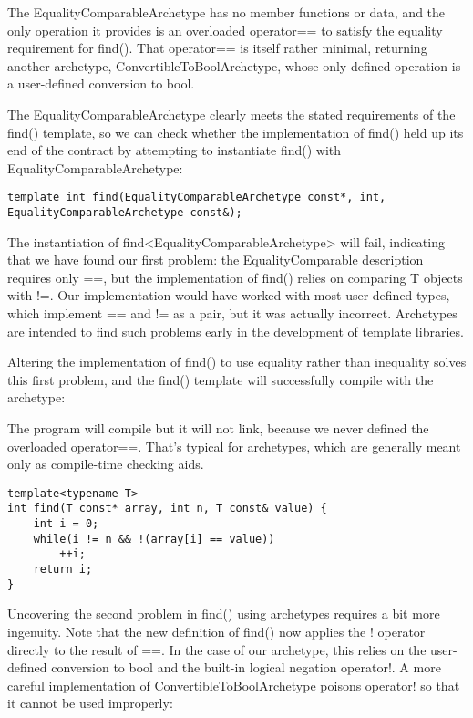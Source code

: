 The EqualityComparableArchetype has no member functions or data, and the only operation it provides is an overloaded operator== to satisfy the equality requirement for find(). That operator== is itself rather minimal, returning another archetype, ConvertibleToBoolArchetype, whose only defined operation is a user-defined conversion to bool.

The EqualityComparableArchetype clearly meets the stated requirements of the find() template, so we can check whether the implementation of find() held up its end of the contract by attempting to instantiate find() with EqualityComparableArchetype:

\begin{lstlisting}[style=styleCXX]
template int find(EqualityComparableArchetype const*, int,
EqualityComparableArchetype const&);
\end{lstlisting}

The instantiation of find<EqualityComparableArchetype> will fail, indicating that we have found our first problem: the EqualityComparable description requires only ==, but the implementation of find() relies on comparing T objects with !=. Our implementation would have worked with most user-defined types, which implement == and != as a pair, but it was actually incorrect. Archetypes are intended to find such problems early in the development of template libraries.

Altering the implementation of find() to use equality rather than inequality solves this first problem, and the find() template will successfully compile with the archetype:

\begin{tcolorbox}[colback=webgreen!5!white,colframe=webgreen!75!black]
\hspace*{0.75cm}The program will compile but it will not link, because we never defined the overloaded operator==. That’s typical for archetypes, which are generally meant only as compile-time checking aids.
\end{tcolorbox}

\begin{lstlisting}[style=styleCXX]
template<typename T>
int find(T const* array, int n, T const& value) {
	int i = 0;
	while(i != n && !(array[i] == value))
		++i;
	return i;
}
\end{lstlisting}

Uncovering the second problem in find() using archetypes requires a bit more ingenuity. Note that the new definition of find() now applies the ! operator directly to the result of ==. In the case of our archetype, this relies on the user-defined conversion to bool and the built-in logical negation operator!. A more careful implementation of ConvertibleToBoolArchetype poisons operator! so that it cannot be used improperly:

